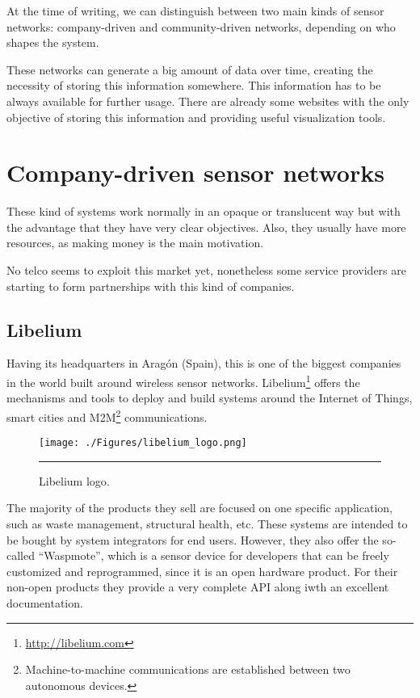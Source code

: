 At the time of writing, we can distinguish between two main kinds of sensor networks: company-driven and community-driven networks, depending on who shapes the system.

These networks can generate a big amount of data over time, creating the necessity of storing this information somewhere. This information has to be always available for further usage. There are already some websites with the only objective of storing this information and providing useful visualization tools.


\section{Company-driven sensor networks}

These kind of systems work normally in an opaque or translucent way but with the advantage that they have very clear objectives. Also, they usually have more resources, as making money is the main motivation.

No telco seems to exploit this market yet, nonetheless some service providers are starting to form partnerships with this kind of companies.

\subsection{Libelium}

Having its headquarters in Aragón (Spain), this is one of the biggest companies in the world built around wireless sensor networks. Libelium\footnote{\url{http://libelium.com}} offers the mechanisms and tools to deploy and build systems around the Internet of Things, smart cities and M2M\footnote{Machine-to-machine communications are established between two autonomous devices.} communications.

\begin{figure}[htbp]
    \centering
    \texttt{[image: ./Figures/libelium\_logo.png]}
        \rule{35em}{0.5pt}
        \caption[Libelium logo]{Libelium logo.}
    \label{fig:ArduinoUNO}
\end{figure}

The majority of the products they sell are focused on one specific application, such as waste management, structural health, etc. These systems are intended to be bought by system integrators for end users. However, they also offer the so-called ``Waspmote'', which is a sensor device for developers that can be freely customized and reprogrammed, since it is an open hardware product. For their non-open products they provide a very complete API along iwth an excellent documentation.


